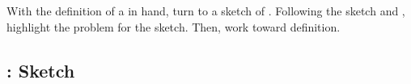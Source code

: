 



\begin{note}
  With the definition of a \tor{} in hand, turn to a sketch of \tR{}.
  Following the sketch and , highlight the problem for the sketch.
  Then, work toward definition.
\end{note}

\subsection{: Sketch}
\label{cha:typical:sec:tR:tRSketch}

